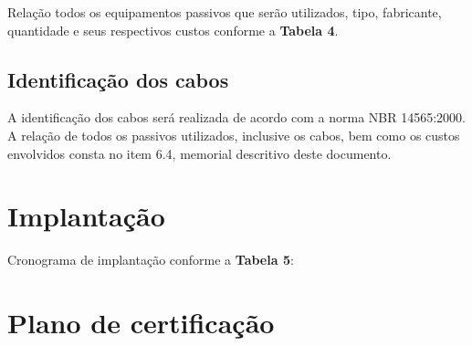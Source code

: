 \documentclass[	DIV=calc,%
							paper=a4,%
							fontsize=12pt,%
							onecolumn]{scrartcl}	 					%
\begin{document}
Relação todos os equipamentos passivos que serão utilizados, tipo, fabricante, quantidade e seus respectivos custos conforme a \textbf{Tabela 4}.

\subsection{Identificação dos cabos}
A identificação dos cabos será realizada de acordo com a norma NBR 14565:2000. A relação de todos os passivos utilizados, inclusive os cabos, bem como os custos envolvidos consta no item 6.4, memorial descritivo deste documento. 

\section{Implantação}
Cronograma de implantação conforme a \textbf{Tabela 5}:

\section{Plano de certificação}
\end{document}

